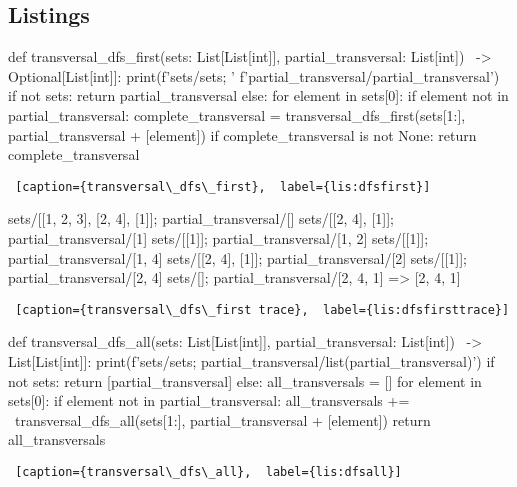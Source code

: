 \subsection{Listings}\label{sec:listings}

\begin{center}

\begin{minipage}{\linewidth}
\begin{python}[numbers=left]
def transversal_dfs_first(sets: List[List[int]],
                          partial_transversal: List[int]) \
                          -> Optional[List[int]]:
  print(f'sets/{sets}; '
        f'partial_transversal/{partial_transversal}')  
  if not sets:
    return partial_transversal
  else:
    for element in sets[0]:
      if element not in partial_transversal:
        complete_transversal = transversal_dfs_first(sets[1:],
                                                     partial_transversal 
                                                     + [element])
        if complete_transversal is not None:
          return complete_transversal    
\end{python}
\begin{lstlisting} [caption={transversal\_dfs\_first},  label={lis:dfsfirst}]
\end{lstlisting}
\end{minipage}


\begin{minipage}{\linewidth}

\begin{python}[numbers=left]
sets/[[1, 2, 3], [2, 4], [1]]; partial_transversal/[]
sets/[[2, 4], [1]]; partial_transversal/[1]
sets/[[1]]; partial_transversal/[1, 2]
sets/[[1]]; partial_transversal/[1, 4]
sets/[[2, 4], [1]]; partial_transversal/[2]
sets/[[1]]; partial_transversal/[2, 4]
sets/[]; partial_transversal/[2, 4, 1]
                                =>  [2, 4, 1]
\end{python}
\begin{lstlisting} [caption={transversal\_dfs\_first trace},  label={lis:dfsfirsttrace}]
\end{lstlisting}
\end{minipage}


\begin{minipage}{\linewidth}
\begin{python}[numbers=left]
def transversal_dfs_all(sets: List[List[int]],
                        partial_transversal: List[int]) \
                        -> List[List[int]]:
  print(f'sets/{sets}; partial_transversal/{list(partial_transversal)}')
  if not sets:
    return [partial_transversal]
  else:
    all_transversals = []
    for element in sets[0]:
      if element not in partial_transversal:
        all_transversals += \
          transversal_dfs_all(sets[1:], partial_transversal + [element])
    return all_transversals
\end{python}
\begin{lstlisting} [caption={transversal\_dfs\_all},  label={lis:dfsall}]
\end{lstlisting}
\end{minipage}



\end{center}
